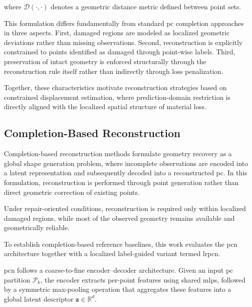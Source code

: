 \noindent where $\mathcal{D}(\cdot,\cdot)$ denotes a geometric distance metric defined between point sets.

This formulation differs fundamentally from standard \ac{pc} completion approaches in three aspects. First, damaged regions are modeled as localized geometric deviations rather than missing observations. Second, reconstruction is explicitly constrained to points identified as damaged through point-wise labels. Third, preservation of intact geometry is enforced structurally through the reconstruction rule itself rather than indirectly through loss penalization.

Together, these characteristics motivate reconstruction strategies based on constrained displacement estimation, where prediction-domain restriction is directly aligned with the localized spatial structure of material loss.

\subsection{Completion-Based Reconstruction}
\label{sec:completion_methods}

Completion-based reconstruction methods formulate geometry recovery as a global shape generation problem, where incomplete observations are encoded into a latent representation and subsequently decoded into a reconstructed \ac{pc}. In this formulation, reconstruction is performed through point generation rather than direct geometric correction of existing points. 

Under repair-oriented conditions, reconstruction is required only within localized damaged regions, while most of the observed geometry remains available and geometrically reliable. 

To establish completion-based reference baselines, this work evaluates the \ac{pcn} \cite{Yuan2019} architecture together with a localized label-guided variant termed \ac{lrpcn}.

\ac{pcn} follows a coarse-to-fine encoder--decoder architecture. Given an input \ac{pc} partition \(\mathcal{P}_k\), the encoder extracts per-point features using shared \acp{mlp}, followed by a symmetric max-pooling operation that aggregates these features into a global latent descriptor \(\mathbf{z} \in \mathbb{R}^{d}\).


